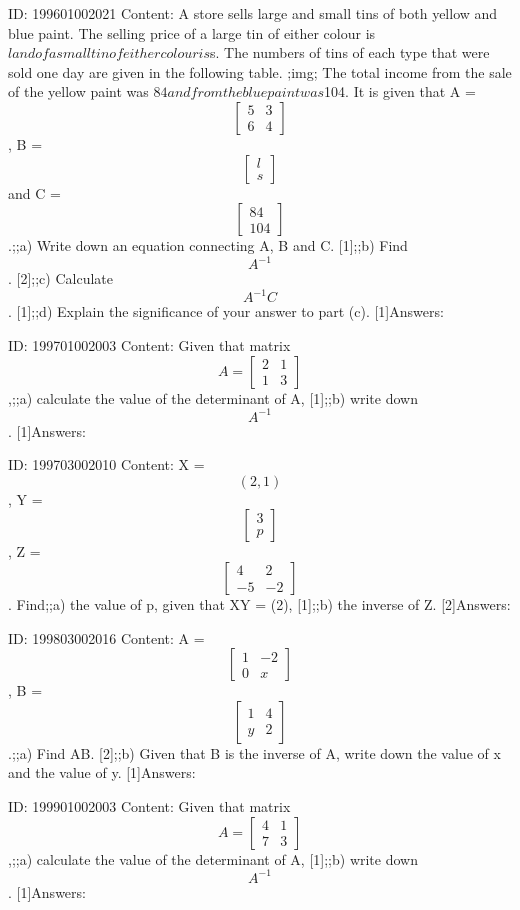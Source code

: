 \documentclass{article}
\begin{document}
ID: 199601002021
Content:
A store sells large and small tins of both yellow and blue paint. The selling price of a large tin of either colour is $l and of a small tin of either colour is $s. The numbers of tins of each type that were sold one day are given in the following table. ;img; The total income from the sale of the yellow paint was $84 and from the blue paint was $104. It is given that A = $$\begin{bmatrix}5&3\\6&4\end{bmatrix}$$, B = $$\begin{bmatrix}l\\s\end{bmatrix}$$  and C = $$\begin{bmatrix}84\\104\end{bmatrix}$$.;;a) Write down an equation connecting A, B and C. [1];;b) Find $$A^{-1}$$. [2];;c) Calculate $$A^{-1} C$$. [1];;d) Explain the significance of your answer to part (c). [1]Answers:

ID: 199701002003
Content:
Given that matrix $$A=\begin{bmatrix}2&1\\1&3\end{bmatrix}$$,;;a) calculate the value of the determinant of A, [1];;b) write down $$A^{-1}$$ . [1]Answers:

ID: 199703002010
Content:
X = $$(2, 1)$$, Y =$$\begin{bmatrix}3\\p\end{bmatrix}$$, Z =$$\begin{bmatrix}4&2\\-5&-2\end{bmatrix}$$. Find;;a) the value of p, given that XY = (2), [1];;b) the inverse of Z. [2]Answers:

ID: 199803002016
Content:
A = $$\begin{bmatrix}1&-2\\0&x\end{bmatrix}$$, B = $$\begin{bmatrix}1&4\\y&2\end{bmatrix}$$.;;a) Find AB. [2];;b) Given that B is the inverse of A, write down the value of x and the value of y. [1]Answers:

ID: 199901002003
Content:
Given that matrix $$A=\begin{bmatrix}4&1\\7&3\end{bmatrix}$$,;;a) calculate the value of the determinant of A, [1];;b) write down $$A^{-1}$$. [1]Answers:
\end{document}
